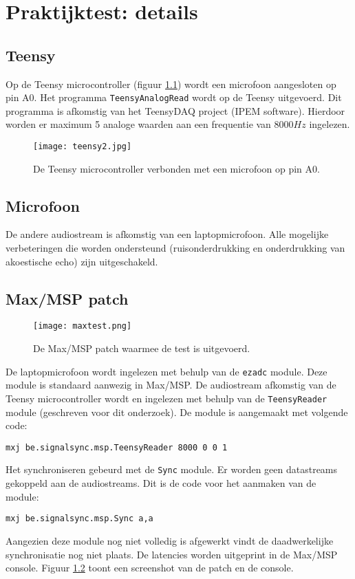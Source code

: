 \chapter{Praktijktest: details}
\label{appendix-d}

\section*{Teensy}

Op de Teensy microcontroller (figuur \ref{teensy-test}) wordt een microfoon aangesloten op pin A0. Het programma \texttt{TeensyAnalogRead} wordt op de Teensy uitgevoerd. Dit programma is afkomstig van het TeensyDAQ project (IPEM software). Hierdoor worden er maximum 5 analoge waarden aan een frequentie van $8000Hz$ ingelezen.

\begin{figure}[!h]
	\captionsetup{width=0.7\textwidth}
	\caption[Teensy testopstelling]{De Teensy microcontroller verbonden met een microfoon op pin A0.}
	\centering
	\advance\parskip0.3cm
	\texttt{[image: teensy2.jpg]}
	\label{teensy-test}
\end{figure}

\section*{Microfoon}

De andere audiostream is afkomstig van een laptopmicrofoon. Alle mogelijke verbeteringen die worden ondersteund (ruisonderdrukking en onderdrukking van akoestische echo) zijn uitgeschakeld.

\section*{Max/MSP patch}

\begin{figure}[!h]
	\captionsetup{width=0.7\textwidth}
	\caption[Max/MSP testopstelling]{De Max/MSP patch waarmee de test is uitgevoerd.}
	\centering
	\advance\parskip0.3cm
	\texttt{[image: maxtest.png]}
	\label{max-test}
\end{figure}

De laptopmicrofoon wordt ingelezen met behulp van de \texttt{ezadc\textapprox} module. Deze module is standaard aanwezig in Max/MSP. De audiostream afkomstig van de Teensy microcontroller wordt en ingelezen met behulp van de \texttt{TeensyReader} module (geschreven voor dit onderzoek). De module is aangemaakt met volgende code:
\begin{center}
	\texttt{mxj\textapprox\ be.signalsync.msp.TeensyReader 8000 0 0 1}
\end{center}
Het synchroniseren gebeurd met de \texttt{Sync} module. Er worden geen datastreams gekoppeld aan de audiostreams. Dit is de code voor het aanmaken van de module:
\begin{center}
	\texttt{mxj\textapprox\ be.signalsync.msp.Sync a,a}
\end{center}
Aangezien deze module nog niet volledig is afgewerkt vindt de daadwerkelijke synchronisatie nog niet plaats. De latencies worden uitgeprint in de Max/MSP console. Figuur \ref{max-test} toont een screenshot van de patch en de console.

